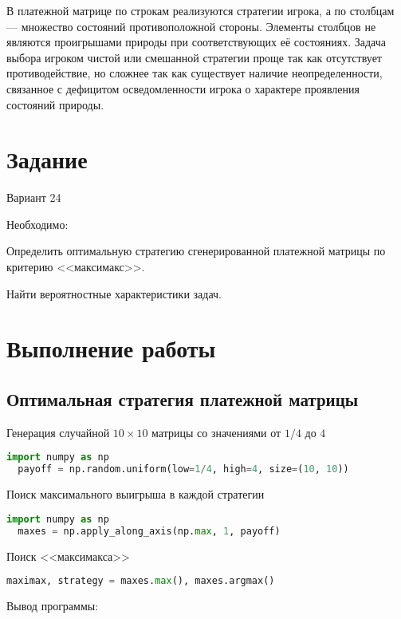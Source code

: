 \documentclass[14pt,a4paper]{extarticle}%
\begin{document}
В платежной матрице по строкам реализуются стратегии игрока, а по
столбцам --- множество состояний противоположной стороны. Элементы
столбцов не являются проигрышами природы при соответствующих её
состояниях. Задача выбора игроком чистой или смешанной стратегии
проще так как отсутствует противодействие, но сложнее так как существует
наличие неопределенности, связанное с дефицитом осведомленности игрока о
характере проявления состояний природы.

\section{Задание}
Вариант 24

Необходимо:

Определить оптимальную стратегию сгенерированной платежной матрицы по критерию <<максимакс>>.

Найти вероятностные характеристики задач.


\pagebreak

\section{Выполнение работы}
\subsection{Оптимальная стратегия платежной матрицы}

Генерация случайной $10 \times 10$ матрицы со значениями от $1/4$ до $4$
\begin{lstlisting}[language=Python]
  import numpy as np
  payoff = np.random.uniform(low=1/4, high=4, size=(10, 10))
\end{lstlisting}

\vspace{.5cm}

Поиск максимального выигрыша в каждой стратегии
\begin{lstlisting}[language=Python]
  import numpy as np
  maxes = np.apply_along_axis(np.max, 1, payoff)
\end{lstlisting}

\vspace{.5cm}

Поиск <<максимакса>>
\begin{lstlisting}[language=Python]
  maximax, strategy = maxes.max(), maxes.argmax()
\end{lstlisting}

\vspace{.5cm}
Вывод программы:
\end{document}
